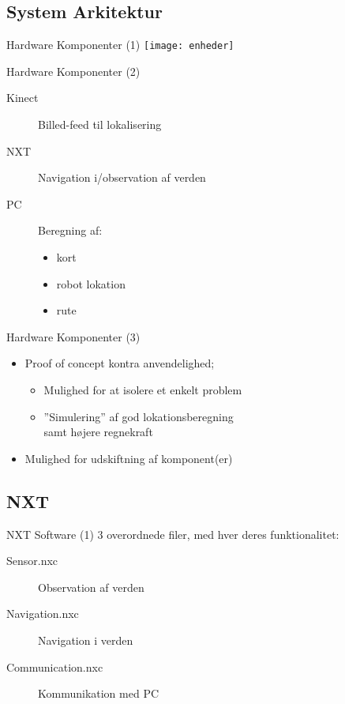 \subsection{System Arkitektur}

\begin{frame}{Hardware Komponenter (1)}
\texttt{[image: enheder]}
\end{frame}

\begin{frame}{Hardware Komponenter (2)}
\begin{description}
\item[Kinect]{Billed-feed til lokalisering}
\item[NXT]{Navigation i/observation af verden}
\item[PC]{Beregning af:}
\begin{itemize}
\item{kort}
\item{robot lokation}
\item{rute}
\end{itemize}
\end{description}
\end{frame}

\begin{frame}{Hardware Komponenter (3)}
\begin{itemize}
\item{Proof of concept kontra anvendelighed;}
\begin{itemize}
\item{Mulighed for at isolere et enkelt problem}
\item{''Simulering'' af god lokationsberegning\\
samt højere regnekraft}
\end{itemize}
\item{Mulighed for udskiftning af komponent(er)}
\end{itemize}
\end{frame}

\subsection{NXT}

\begin{frame}{NXT Software (1)}
3 overordnede filer, med hver deres funktionalitet:
\begin{description}
\item[Sensor.nxc]{Observation af verden}
\item[Navigation.nxc]{Navigation i verden}
\item[Communication.nxc]{Kommunikation med PC}
\end{description}
\end{frame}

